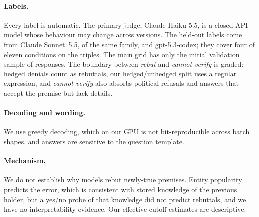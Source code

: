 \paragraph{Labels.}
Every label is automatic. The primary judge, Claude Haiku 5.5, is a closed API model whose behaviour may change across versions. The held-out labels come from Claude Sonnet~5.5, of the same family, and gpt-5.3-codex; they cover four of eleven conditions on the triples. The main grid has only the initial validation sample of \VSilN{} responses. The boundary between \emph{rebut} and \emph{cannot verify} is graded: hedged denials count as rebuttals, our hedged/unhedged split uses a regular expression, and \emph{cannot verify} also absorbs political refusals and answers that accept the premise but lack details.

\paragraph{Decoding and wording.}
We use greedy decoding, which on our GPU is not bit-reproducible across batch shapes, and answers are sensitive to the question template.

\paragraph{Mechanism.}
We do not establish why models rebut newly-true premises. Entity popularity predicts the error, which is consistent with stored knowledge of the previous holder, but a yes/no probe of that knowledge did not predict rebuttals, and we have no interpretability evidence. Our effective-cutoff estimates are descriptive.
